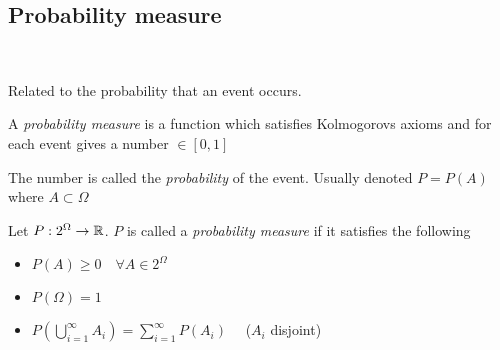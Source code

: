 \subsection{Probability measure}\hfill\\\par
\noindent Related to the probability that an event occurs.
\par\bigskip
\begin{theo}{}
  A \textit{probability measure} is a function which satisfies Kolmogorovs axioms and for each event gives a number $\in [0,1]$
  \par\bigskip
  \noindent The number is called the \textit{probability} of the event. Usually denoted $P=P(A)$ where $A\subset\Omega$
\end{theo}
\par\bigskip
\begin{theo}{}
  Let $P:2^{\Omega}\to\mathbb{R}$. $P$ is called a \textit{probability measure} if it satisfies the following
  \par\bigskip
  \begin{itemize}
    \item $P(A)\geq0\quad \forall A\in 2^{\Omega}$\\
    \item $P(\Omega) = 1$\\
    \item $P(\bigcup_{i=1}^{\infty} A_i) = \sum_{i=1}^{\infty}P(A_i)\quad $ ($A_i$ disjoint)
  \end{itemize}
  \par\bigskip
\end{theo}
\par\bigskip
